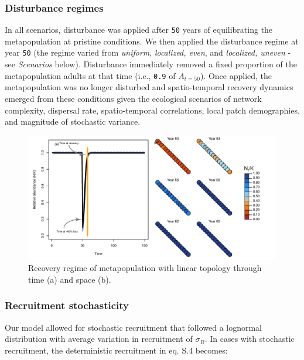 \documentclass[
]{article}
\begin{document}
\hypertarget{disturbance-regimes}{%
\subsubsection{Disturbance regimes}\label{disturbance-regimes}}

In all scenarios, disturbance was applied after \texttt{50} years of
equilibrating the metapopulation at pristine conditions. We then applied
the disturbance regime at year \texttt{50} (the regime varied from
\emph{uniform}, \emph{localized, even}, and \emph{localized, uneven} -
see \emph{Scenarios} below). Disturbance immediately removed a fixed
proportion of the metapopulation adults at that time (i.e., \texttt{0.9}
of \(A_{t=50}\)). Once applied, the metapopulation was no longer
disturbed and spatio-temporal recovery dynamics emerged from these
conditions given the ecological scenarios of network complexity,
dispersal rate, spatio-temporal correlations, local patch demographies,
and magnitude of stochastic variance.

\begin{figure}[H]

{\centering \includegraphics{Managing_for_ecological_surprises_in_metapopulations_files/figure-latex/example disturbance regime-1} 

}

\caption{Recovery regime of metapopulation with linear topology through time (a) and space (b).}\label{fig:example disturbance regime}
\end{figure}

\hypertarget{recruitment-stochasticity}{%
\subsubsection{Recruitment
stochasticity}\label{recruitment-stochasticity}}

Our model allowed for stochastic recruitment that followed a lognormal
distribution with average variation in recruitment of \(\sigma_R\). In
cases with stochastic recruitment, the deterministic recruitment in eq.
S.4 becomes:
\end{document}
